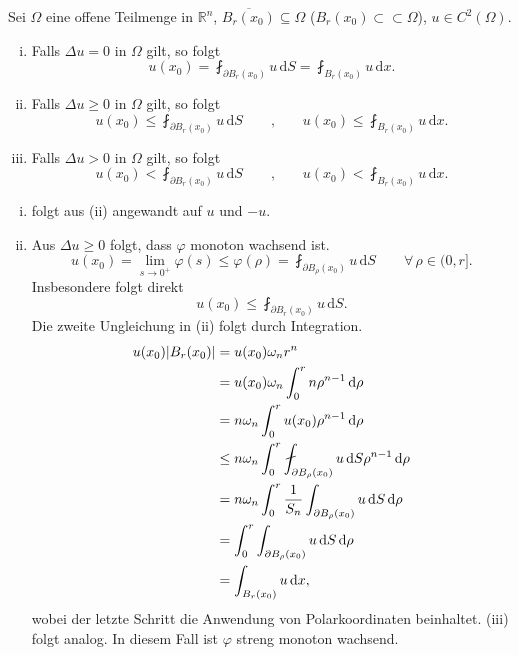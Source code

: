 \begin{korollar}[Mittelwerteigenschaft]
	Sei $\Omega$ eine offene Teilmenge in $\mathbb{R}^n$, $\overline{B_r(x_0)} \subseteq \Omega$ ($B_r(x_0) \subset \subset \Omega$), $u \in C^2(\Omega)$.
	\begin{enumerate}[(i)]
		\item Falls $ \Delta u = 0 $ in $\Omega$ gilt, so folgt
		\begin{equation}
			u(x_0) = \fint_{\partial B_r(x_0)}^{} u \,\mathrm{d}S = \fint_{B_r(x_0)}^{} u 	\,\mathrm{d}x.
		\end{equation}
		\item Falls $\Delta u \geq 0$ in $\Omega$ gilt, so folgt
		\begin{equation}
			u(x_0) \leq  \fint_{\partial B_r(x_0)}^{} u \,\mathrm{d}S \qquad \text{,} \qquad u(x_0) \leq \fint_{B_r(x_0)}^{}u \,\mathrm{d}x.
		\end{equation}
		\item Falls $\Delta u > 0$ in $\Omega$ gilt, so folgt
		\begin{equation}
			u(x_0) < \fint_{\partial B_r(x_0)}^{} u\,\mathrm{d}S \qquad \text{,} \qquad u(x_0) < \fint_{B_r(x_0)}^{} u \,\mathrm{d}x.
		\end{equation}
	\end{enumerate}
	\end{korollar}
	\begin{beweis}
		\begin{enumerate}[(i)]
			\item folgt aus (ii) angewandt auf $u$ und $-u$.
			\item Aus $\Delta u \geq 0$ folgt, dass $\varphi$ monoton wachsend ist.
			\begin{equation}
				u(x_0) = \lim_{s \to 0^+} \varphi(s) \leq \varphi(\rho) = \fint_{\partial B_{\rho}(x_0)}^{}u \,\mathrm{d}S \qquad \forall\, \rho \in (0,r].
			\end{equation}
			Insbesondere folgt direkt
			\[
				u(x_0) \leq \fint_{\partial B_r(x_0)}^{}u \,\mathrm{d}S.
			\]
			Die zweite Ungleichung in (ii) folgt durch Integration.
			\begin{align*}
				u(x_0)\abs{B_r(x_0)} &= u(x_0) \omega_n r^n \\ &= u(x_0) \omega_n \int_{0}^{r}n \rho^{n-1} \,\mathrm{d}\rho \\ 
				&= n\omega_n \int_{0}^{r}u(x_0)\rho^{n-1} \,\mathrm{d}\rho  \\
				&\leq n \omega_n \int_{0}^{r}\fint_{\partial B_{\rho}(x_0)}^{} u \,\mathrm{d}S \rho^{n-1} \,\mathrm{d}\rho \\
				&= n \omega_n \int_{0}^{r} \frac{1}{S_n} \int_{\partial B_{\rho}(x_0)}^{} u \,\mathrm{d}S \,\mathrm{d}\rho \\
				&= \int_{0}^{r} \int_{\partial B_{\rho}(x_0)}^{}u \,\mathrm{d}S \,\mathrm{d}\rho \\
				&= \int_{B_{r}(x_0)}^{}u \,\mathrm{d}x,
			\end{align*}
			wobei der letzte Schritt die Anwendung von Polarkoordinaten beinhaltet. (iii) folgt analog. In diesem Fall ist $\varphi$ streng monoton wachsend.
			\end{enumerate}
	\end{beweis}

